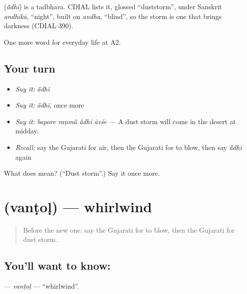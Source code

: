 \begin{cousinweb}
\textbf{} (\emph{ā̃dhī}) is a tadbhava. CDIAL lists it, glossed \textquotedblleft{}duststorm\textquotedblright{}, under Sanskrit \emph{andhikā}, \textquotedblleft{}night\textquotedblright{}, built on \emph{andha}, \textquotedblleft{}blind\textquotedblright{}, so the storm is one that brings darkness (CDIAL 390).
\end{cousinweb}

\begin{grammarlens}[title={What you've built}]
One more word for everyday life at A2.
\end{grammarlens}

\subsection*{Your turn}
\begin{itemize}
\raggedright
  \item \emph{Say it:} \emph{ā̃dhī}
  \item \emph{Say it:} \emph{ā̃dhī}, once more
  \item \emph{Say it:} \emph{bapore raṇmā̃ ā̃dhī āvśe} — A dust storm will come in the desert at midday.
  \item \emph{Recall:} say the Gujarati for air, then the Gujarati for to blow, then say \emph{ā̃dhī} again
\end{itemize}

\begin{tcolorbox}[breakable,colback=teal!4,colframe=teal!35!black,title={Before you move on}]
What does  mean? (\textquotedblleft{}Dust storm\textquotedblright{}.) Say it once more.
\end{tcolorbox}
\section[\texorpdfstring{\gu{વંટોળ} (vanṭoḷ)}{વંટોળ (vanṭoḷ)}]{ (vanṭoḷ) — whirlwind}

\label{lesson:GU-C217-vantol}



\begin{quote}
Before the new one: say the Gujarati for to blow, then the Gujarati for dust storm.
\end{quote}

\subsection*{You'll want to know: }
\textbf{} — \emph{vanṭoḷ} — \textquotedblleft{}whirlwind\textquotedblright{}.

